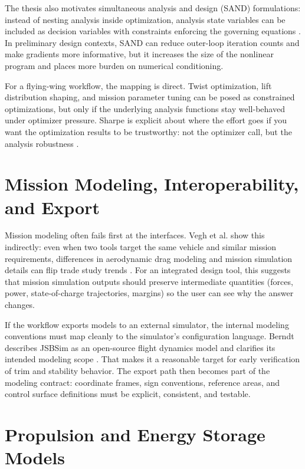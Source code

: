 The thesis also motivates simultaneous analysis and design (SAND) formulations: instead of nesting analysis inside optimization, analysis state variables can be included as decision variables with constraints enforcing the governing equations \cite{Sharpe2021AeroSandbox}. In preliminary design contexts, SAND can reduce outer-loop iteration counts and make gradients more informative, but it increases the size of the nonlinear program and places more burden on numerical conditioning.

For a flying-wing workflow, the mapping is direct. Twist optimization, lift distribution shaping, and mission parameter tuning can be posed as constrained optimizations, but only if the underlying analysis functions stay well-behaved under optimizer pressure. Sharpe is explicit about where the effort goes if you want the optimization results to be trustworthy: not the optimizer call, but the analysis robustness \cite{Sharpe2021AeroSandbox}.

\chapter{Mission Modeling, Interoperability, and Export}
Mission modeling often fails first at the interfaces. Vegh et al. show this indirectly: even when two tools target the same vehicle and similar mission requirements, differences in aerodynamic drag modeling and mission simulation details can flip trade study trends \cite{Vegh2019NDARCSUAVE}. For an integrated design tool, this suggests that mission simulation outputs should preserve intermediate quantities (forces, power, state-of-charge trajectories, margins) so the user can see why the answer changes.

If the workflow exports models to an external simulator, the internal modeling conventions must map cleanly to the simulator's configuration language. Berndt describes JSBSim as an open-source flight dynamics model and clarifies its intended modeling scope \cite{Berndt2009JSBSim}. That makes it a reasonable target for early verification of trim and stability behavior. The export path then becomes part of the modeling contract: coordinate frames, sign conventions, reference areas, and control surface definitions must be explicit, consistent, and testable.

\chapter{Propulsion and Energy Storage Models}
